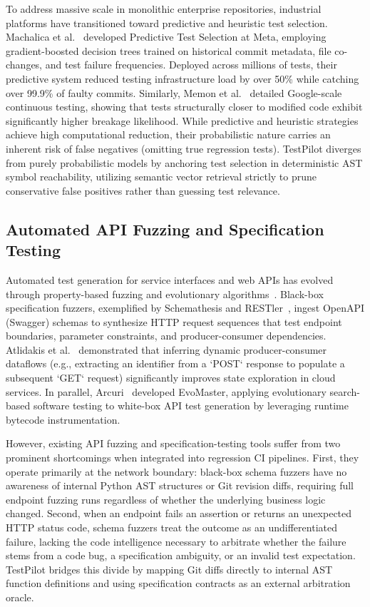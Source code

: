\documentclass[12pt,onecolumn,draftclsnofoot]{IEEEtran}
\begin{document}
To address massive scale in monolithic enterprise repositories, industrial platforms have transitioned toward predictive and heuristic test selection. Machalica et al.~\cite{machalica2019predictive} developed Predictive Test Selection at Meta, employing gradient-boosted decision trees trained on historical commit metadata, file co-changes, and test failure frequencies. Deployed across millions of tests, their predictive system reduced testing infrastructure load by over 50\% while catching over 99.9\% of faulty commits. Similarly, Memon et al.~\cite{memon2017taming} detailed Google-scale continuous testing, showing that tests structurally closer to modified code exhibit significantly higher breakage likelihood. While predictive and heuristic strategies achieve high computational reduction, their probabilistic nature carries an inherent risk of false negatives (omitting true regression tests). TestPilot diverges from purely probabilistic models by anchoring test selection in deterministic AST symbol reachability, utilizing semantic vector retrieval strictly to prune conservative false positives rather than guessing test relevance.

\subsection{Automated API Fuzzing and Specification Testing}
Automated test generation for service interfaces and web APIs has evolved through property-based fuzzing and evolutionary algorithms~\cite{atlidakis2019restler,arcuri2019restful,hatfield2020hypothesis}. Black-box specification fuzzers, exemplified by Schemathesis and RESTler~\cite{atlidakis2019restler}, ingest OpenAPI (Swagger) schemas to synthesize HTTP request sequences that test endpoint boundaries, parameter constraints, and producer-consumer dependencies. Atlidakis et al.~\cite{atlidakis2019restler} demonstrated that inferring dynamic producer-consumer dataflows (e.g., extracting an identifier from a `POST` response to populate a subsequent `GET` request) significantly improves state exploration in cloud services. In parallel, Arcuri~\cite{arcuri2019restful} developed EvoMaster, applying evolutionary search-based software testing to white-box API test generation by leveraging runtime bytecode instrumentation.

However, existing API fuzzing and specification-testing tools suffer from two prominent shortcomings when integrated into regression CI pipelines. First, they operate primarily at the network boundary: black-box schema fuzzers have no awareness of internal Python AST structures or Git revision diffs, requiring full endpoint fuzzing runs regardless of whether the underlying business logic changed. Second, when an endpoint fails an assertion or returns an unexpected HTTP status code, schema fuzzers treat the outcome as an undifferentiated failure, lacking the code intelligence necessary to arbitrate whether the failure stems from a code bug, a specification ambiguity, or an invalid test expectation. TestPilot bridges this divide by mapping Git diffs directly to internal AST function definitions and using specification contracts as an external arbitration oracle.
\end{document}
